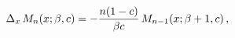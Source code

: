 \[\Delta_{x}\mathop{M_{n}\/}\nolimits\!\left(x;\beta,c\right)=-\frac{n(1-c)}{%
\beta c}\mathop{M_{n-1}\/}\nolimits\!\left(x;\beta+1,c\right),\]